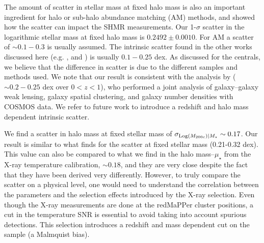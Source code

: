 {%

The amount of scatter in stellar mass at fixed halo mass is also an important ingredient for halo or sub-halo abundance matching (AM) methods, and \citet{kravtsov} showed how the scatter can impact the SHMR measurements. Our 1-$\sigma$ scatter in the logarithmic stellar mass at fixed halo mass is $0.2492\pm 0.0010$. For AM a scatter of $\sim 0.1-0.3$ is usually assumed.
The intrinsic scatter found in the other works discussed here (e.g. \citealt{illustris}, \citealt{leauthaud} and \citealt{kravtsov}) is usually $0.1-0.25$ dex. As discussed for the centrals, we believe that the difference in scatter is due to the different samples and methods used. We note that our result is consistent with the analysis by \citealt{leauthaud} ($\sim 0.2-0.25$ dex over $0<z<1$), who performed a joint analysis of galaxy--galaxy weak lensing, galaxy spatial clustering, and galaxy number densities with COSMOS data. We refer to future work to introduce a redshift and halo mass dependent intrinsic scatter.

We find a scatter in halo mass at fixed stellar mass of $\sigma_{{\rm Log}(M_{200c})|M_\star}\sim 0.17$. Our result is similar to what \citet{andreon12} finds for the scatter at fixed stellar mass (0.21-0.32 dex). This value can also be compared to what we find in the halo mass--$\mu_\star$ from the X-ray temperature calibration, $\sim 0.18$, and they are very close despite the fact that they have been derived very differently.
However, to truly compare the scatter on a physical level, one would need to understand the correlation between the parameters and the selection effects introduced by the X-ray selection. Even though the X-ray measurements are done at the redMaPPer cluster positions, a cut in the temperature SNR is essential to avoid taking into account spurious detections. This selection introduces a redshift and mass dependent cut on the sample (a Malmquist bias). 

}
